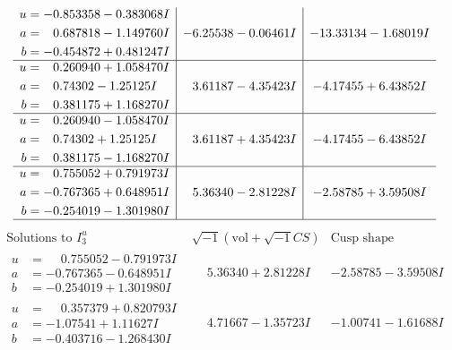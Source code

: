 \documentclass[1p]{elsarticle_modified}
\theoremstyle{definition}
\newcommand{\I}{\sqrt{-1}}
\begin{document}
$$\begin{array}{c|c|c}
\begin{aligned}
u &= -0.853358 - 0.383068 I \\
a &= \phantom{-}0.687818 - 1.149760 I \\
b &= -0.454872 + 0.481247 I\end{aligned}
 & -6.25538 - 0.06461 I & -13.33134 - 1.68019 I \\ \hline\begin{aligned}
u &= \phantom{-}0.260940 + 1.058470 I \\
a &= \phantom{-}0.74302 - 1.25125 I \\
b &= \phantom{-}0.381175 + 1.168270 I\end{aligned}
 & \phantom{-}3.61187 - 4.35423 I & -4.17455 + 6.43852 I \\ \hline\begin{aligned}
u &= \phantom{-}0.260940 - 1.058470 I \\
a &= \phantom{-}0.74302 + 1.25125 I \\
b &= \phantom{-}0.381175 - 1.168270 I\end{aligned}
 & \phantom{-}3.61187 + 4.35423 I & -4.17455 - 6.43852 I \\ \hline\begin{aligned}
u &= \phantom{-}0.755052 + 0.791973 I \\
a &= -0.767365 + 0.648951 I \\
b &= -0.254019 - 1.301980 I\end{aligned}
 & \phantom{-}5.36340 - 2.81228 I & -2.58785 + 3.59508 I\\
 \hline 
 \end{array}$$\newpage$$\begin{array}{c|c|c}  
\text{Solutions to }I^u_{3}& \I (\text{vol} + \sqrt{-1}CS) & \text{Cusp shape}\\
 \hline 
\begin{aligned}
u &= \phantom{-}0.755052 - 0.791973 I \\
a &= -0.767365 - 0.648951 I \\
b &= -0.254019 + 1.301980 I\end{aligned}
 & \phantom{-}5.36340 + 2.81228 I & -2.58785 - 3.59508 I \\ \hline\begin{aligned}
u &= \phantom{-}0.357379 + 0.820793 I \\
a &= -1.07541 + 1.11627 I \\
b &= -0.403716 - 1.268430 I\end{aligned}
 & \phantom{-}4.71667 - 1.35723 I & -1.00741 - 1.61688 I \\ \hline\begin{aligned}

\end{aligned}
\end{array}$$
\end{document}
